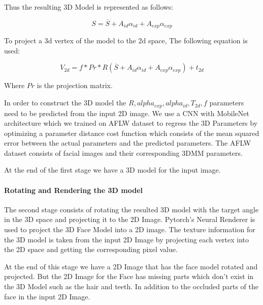 Thus the resulting 3D Model is represented as follows:

\[ S = \overline{S} + A _{id}\alpha _{id} + A _{exp}\alpha _{exp} \]

To project a 3d vertex of the model to the 2d space, The following equation is used:

\[V _{2d} = f*Pr*R(\overline{S} + A _{id}\alpha _{id} + A _{exp}\alpha _{exp}) + t _{2d}\]

Where $Pr$ is the projection matrix.

In order to construct the 3D model the $R, alpha _{exp}, alpha _{id}, T _{2d}, f$ parameters need to be predicted from the input 2D image. We use a CNN with MobileNet architecture which we trained on AFLW dataset to regress the 3D Parameters by optimizing a parameter distance cost function which consists of the mean squared error between the actual parameters and the predicted parameters. The AFLW dataset consists of facial images and their corresponding 3DMM parameters. 

At the end of the first stage we have a 3D model for the input image.

\paragraph{Rotating and Rendering the 3D model}
The second stage consists of rotating the resulted 3D model with the target angle in the 3D space and projecting it to the 2D Image. Pytorch's Neural Renderer is used to project the 3D Face Model into a 2D image. The texture information for the 3D model is taken from the input 2D Image by projecting each vertex into the 2D space and getting the corresponding pixel value.

At the end of this stage we have a 2D Image that has the face model rotated and projected. But the 2D Image for the Face has missing parts which don't exist in the 3D Model such as the hair and teeth. In addition to the occluded parts of the face in the input 2D Image. 

